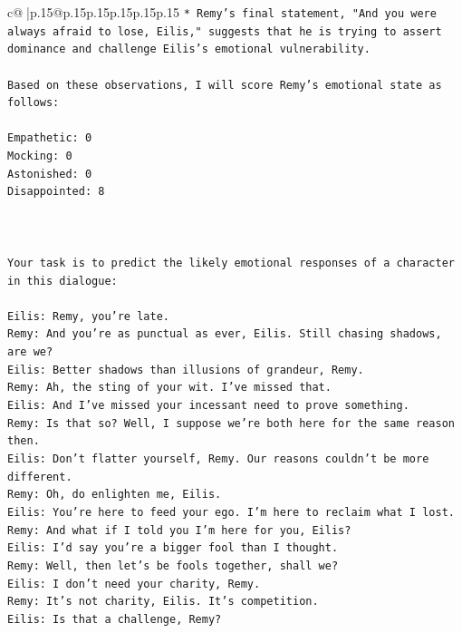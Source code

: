 \documentclass{article}
\begin{document}
{\begin{supertabular}{c@{$\;$}|p{.15\linewidth}@{}p{.15\linewidth}p{.15\linewidth}p{.15\linewidth}p{.15\linewidth}p{.15\linewidth}}
{{{\texttt{* Remy's final statement, "And you were always afraid to lose, Eilis," suggests that he is trying to assert dominance and challenge Eilis's emotional vulnerability.} \\
\\ 
\texttt{Based on these observations, I will score Remy's emotional state as follows:} \\
\\ 
\texttt{Empathetic: 0} \\
\texttt{Mocking: 0} \\
\texttt{Astonished: 0} \\
\texttt{Disappointed: 8} \\
\\ 
\\ 
\\ 
\texttt{Your task is to predict the likely emotional responses of a character in this dialogue:} \\
\\ 
\texttt{Eilis: Remy, you're late.} \\
\texttt{Remy: And you're as punctual as ever, Eilis. Still chasing shadows, are we?} \\
\texttt{Eilis: Better shadows than illusions of grandeur, Remy.} \\
\texttt{Remy: Ah, the sting of your wit. I've missed that. } \\
\texttt{Eilis: And I've missed your incessant need to prove something.} \\
\texttt{Remy: Is that so? Well, I suppose we're both here for the same reason then.} \\
\texttt{Eilis: Don't flatter yourself, Remy. Our reasons couldn't be more different.} \\
\texttt{Remy: Oh, do enlighten me, Eilis. } \\
\texttt{Eilis: You're here to feed your ego. I'm here to reclaim what I lost.} \\
\texttt{Remy: And what if I told you I'm here for you, Eilis?} \\
\texttt{Eilis: I'd say you're a bigger fool than I thought.} \\
\texttt{Remy: Well, then let's be fools together, shall we? } \\
\texttt{Eilis: I don't need your charity, Remy.} \\
\texttt{Remy: It's not charity, Eilis. It's competition. } \\
\texttt{Eilis: Is that a challenge, Remy?} \\
}}}
\end{supertabular}}
\end{document}
